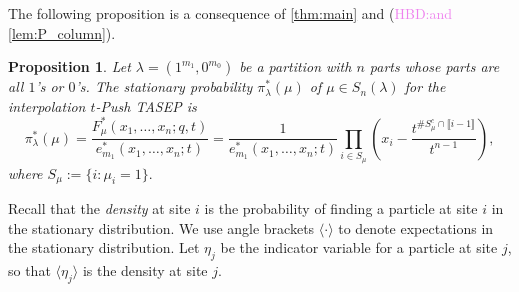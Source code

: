 \documentclass[12pt]{amsart}
\newtheorem{prop}[thm]{Proposition}
\theoremstyle{definition}
\def\LW#1{(\textcolor{teal}{LW:#1})}
\def\HBD#1{(\textcolor{violet}{HBD:#1})}
\begin{document}
The following proposition is a consequence of
\cref{thm:main} and 
\cite[Lemma 7.2]{BenDaliWilliams2025}\HBD{and \cref{lem:P_column}}.
\begin{prop}\label{prop:01}
Let $\lambda = (1^{m_1}, 0^{m_0})$ be a partition with $n$ parts whose parts are all $1$'s or $0$'s.  The stationary probability $\pi_\lambda^*(\mu)$ of $\mu \in S_n(\lambda)$ for the 
interpolation $t$-Push TASEP is 
$$\pi^*_\lambda(\mu) = 
\frac{F_{\mu}^*(x_1,\dots,x_n; q, t)}{e^*_{m_1}(x_1,\dots,x_n;t)} =
\frac{1}{e^*_{m_1}(x_1,\dots,x_n;t)} \prod_{i\in S_\mu}\left(x_i-\frac{t^{\#S^c_\mu\cap \llbracket i-1\rrbracket}}{t^{n-1}}\right), $$
    where $S_{\mu}:=\{i: \mu_i=1\}.$
\end{prop}
Recall that the \emph{density} at site $i$ is the probability of finding a particle at site $i$ in the stationary distribution.
We  use angle brackets 
$\langle \cdot \rangle$ to denote expectations in the stationary distribution.  Let 
$\eta_j$ be the indicator variable for a particle at site $j$, so that 
$\langle \eta_j\rangle$ is the density at site $j$.  
\end{document}
